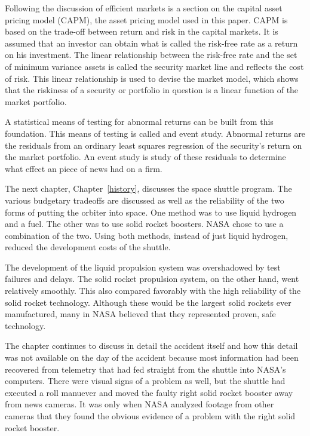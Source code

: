 Following the discussion of efficient markets is a section
on the capital asset pricing model (CAPM), the asset pricing
model used in this paper.
CAPM is based on the trade-off between return and risk in
the capital markets.
It is assumed that an investor can obtain what is called the
risk-free rate as a return on his investment.
The linear relationship between the risk-free rate and the
set of minimum variance assets is called the security market
line and reflects the cost of risk.
This linear relationship is used to devise the market model,
which shows that the riskiness of a security or portfolio in
question is a linear function of the market portfolio.

A statistical means of testing for abnormal returns can be
built from this foundation.  This means of testing is called
and event study.
Abnormal returns are the residuals from an ordinary least
squares regression of the security's return on the market
portfolio.  An event study is study of these residuals to
determine what effect an piece of news had on a firm.

The next chapter, Chapter~\ref{history}, discusses the space
shuttle program.  The various budgetary tradeoffs are
discussed as well as the reliability of the two forms of
putting the orbiter into space.  One method was to use
liquid hydrogen and a fuel.  The other was to use solid
rocket boosters.  NASA chose to use a combination of the
two.  Using both methods, instead of just liquid hydrogen, reduced 
the development costs of the shuttle.

The development of the liquid propulsion system was
overshadowed by test failures and delays.  The solid rocket
propulsion system, on the other hand, went relatively
smoothly.  This also compared favorably with the high
reliability of the solid rocket technology.  Although these
would be the largest solid rockets ever manufactured, many
in NASA believed that they represented proven, safe
technology.

The chapter continues to discuss in detail the accident
itself and how this detail was not available on the day of
the accident because most information had been recovered from telemetry
that had fed straight from the shuttle into NASA's
computers.  There were visual signs of a problem as well,
but the shuttle had executed a roll manuever and moved the
faulty right solid rocket booster away from news cameras. 
It was only when NASA analyzed footage from other cameras
that they found the obvious evidence of a problem with the
right solid rocket booster.

